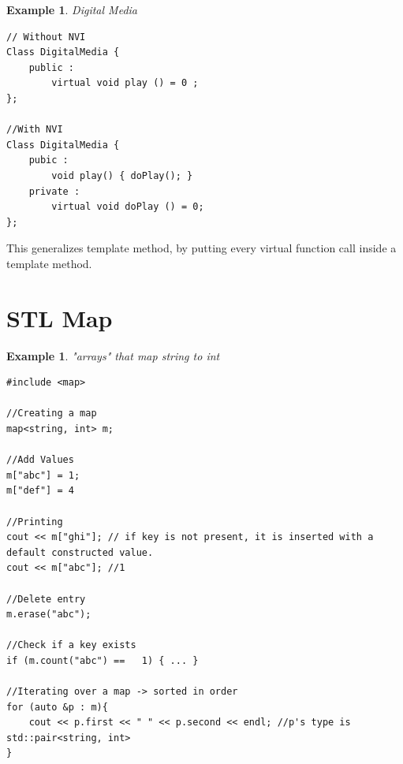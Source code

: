 \documentclass{article}
\newtheorem{ex}[theorem]{Example}
\begin{document}
\begin{ex} Digital Media 
\begin{lstlisting}
// Without NVI
Class DigitalMedia {
	public : 
		virtual void play () = 0 ;
};

//With NVI
Class DigitalMedia {
	pubic :
		void play() { doPlay(); }
	private :
		virtual void doPlay () = 0; 
};
\end{lstlisting}
\end{ex}

This generalizes template method, by putting every virtual function call inside a template method.

\section{STL Map}

\begin{ex} "arrays" that map string to int
\begin{lstlisting}
#include <map>

//Creating a map
map<string, int> m;

//Add Values
m["abc"] = 1;
m["def"] = 4

//Printing
cout << m["ghi"]; // if key is not present, it is inserted with a default constructed value. 
cout << m["abc"]; //1

//Delete entry 
m.erase("abc");

//Check if a key exists 
if (m.count("abc") == 	1) { ... } 

//Iterating over a map -> sorted in order
for (auto &p : m){
	cout << p.first << " " << p.second << endl; //p's type is std::pair<string, int>
}
\end{lstlisting}
\end{ex}
\end{document}
